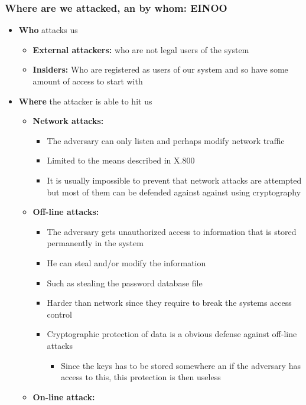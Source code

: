 \documentclass[11pt]{article}
\begin{document}
\subsubsection{Where are we attacked, an by whom: EINOO}
\label{sec:orgf74089b}
\begin{itemize}
\item \textbf{Who} attacks us
\begin{itemize}
\item \textbf{External attackers:} who are not legal users of the system
\item \textbf{Insiders:} Who are registered as users of our system and so have some amount of access to start with
\end{itemize}

\item \textbf{Where} the attacker is able to hit us
\begin{itemize}
\item \textbf{Network attacks:}
\begin{itemize}
\item The adversary can only listen and perhaps modify network traffic
\item Limited to the means described in X.800
\item It is usually impossible to prevent that network attacks are attempted but most of them can be defended against against using cryptography
\end{itemize}
\item \textbf{Off-line attacks:}
\begin{itemize}
\item The adversary gets unauthorized access to information that is stored permanently in the system
\item He can steal and/or modify the information
\item Such as stealing the password database file
\item Harder than network since they require to break the systems access control
\item Cryptographic protection of data is a obvious defense against off-line attacks
\begin{itemize}
\item Since the keys has to be stored somewhere an if the adversary has access to this, this protection is then useless
\end{itemize}
\end{itemize}
\item \textbf{On-line attack:}
\begin{itemize}

\end{itemize}
\end{itemize}
\end{itemize}
\end{document}
